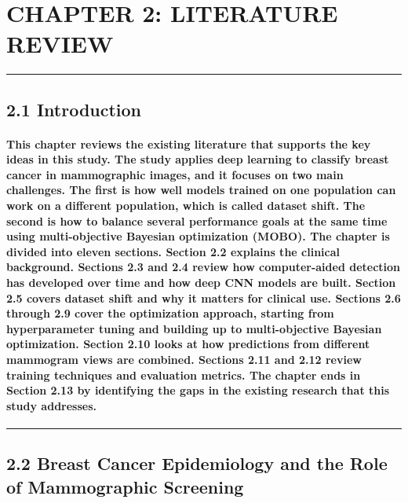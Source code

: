 \section{CHAPTER 2: LITERATURE
REVIEW}\label{chapter-2-literature-review}

\begin{center}\rule{0.5\linewidth}{0.5pt}\end{center}

\subsection{2.1 Introduction}\label{introduction}

\paragraph{This chapter reviews the existing literature that supports the key ideas in this study. The study applies deep learning to classify breast cancer in mammographic images, and it focuses on two main challenges. The first is how well models trained on one population can work on a different population, which is called dataset shift. The second is how to balance several performance goals at the same time using multi-objective Bayesian optimization (MOBO). The chapter is divided into eleven sections. Section 2.2 explains the clinical background. Sections 2.3 and 2.4 review how computer-aided detection has developed over time and how deep CNN models are built. Section 2.5 covers dataset shift and why it matters for clinical use. Sections 2.6 through 2.9 cover the optimization approach, starting from hyperparameter tuning and building up to multi-objective Bayesian optimization. Section 2.10 looks at how predictions from different mammogram views are combined. Sections 2.11 and 2.12 review training techniques and evaluation metrics. The chapter ends in Section 2.13 by identifying the gaps in the existing research that this study addresses.}

\begin{center}\rule{0.5\linewidth}{0.5pt}\end{center}

\subsection{2.2 Breast Cancer Epidemiology and the Role of Mammographic
Screening}\label{breast-cancer-epidemiology-and-the-role-of-mammographic-screening}


